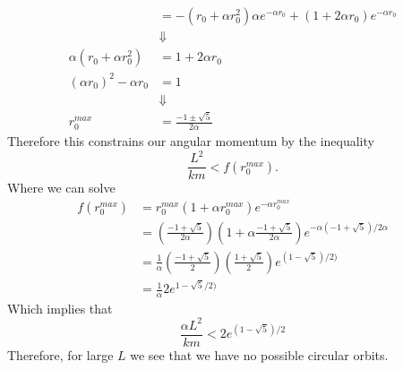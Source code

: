 \documentclass[11pt]{article}
\numberwithin{equation}{section}
\begin{document}
\begin{enumerate}[(a)]
\begin{align*}
&=  -\left(r_0 + \alpha r_0^2\right)\alpha e^{-\alpha r_0} + \left(1 + 2\alpha r_0\right)e^{-\alpha r_0}\\
&\Downarrow\\
\alpha(r_0 + \alpha r_0^2) &= 1 + 2\alpha r_0\\
(\alpha r_0)^2 - \alpha r_0 &= 1\\
&\Downarrow\\
r^{max}_0 &= \frac{-1\pm\sqrt{5}}{2\alpha}
\end{align*}
Therefore this constrains our angular momentum by the inequality
$$\frac{L^2}{km} < f(r^{max}_0).$$
Where we can solve
\begin{align*}
f(r^{max}_0) &= r^{max}_0\left(1 + \alpha r^{max}_0\right)e^{-\alpha r^{max}_0}\\
&= \left(\frac{-1+\sqrt{5}}{2\alpha}\right)\left(1 + \alpha\frac{-1+\sqrt{5}}{2\alpha}\right)e^{-\alpha (-1+\sqrt{5})/2\alpha}\\
&= \frac{1}{\alpha}\left(\frac{-1+\sqrt{5}}{2}\right)\left(\frac{1+\sqrt{5}}{2}\right)e^{(1-\sqrt{5})/2)}\\
&= \frac{1}{\alpha}2e^{1-\sqrt{5}/2)}
\end{align*}
Which implies that
$$\frac{\alpha L^2}{km} < 2e^{(1-\sqrt{5})/2}$$
Therefore, for large $L$ we see that we have no possible circular orbits.


\end{enumerate}
\end{document}

